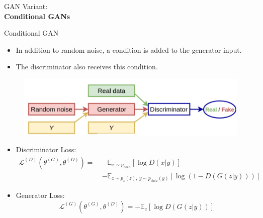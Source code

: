 \begin{frame}{}
    \LARGE GAN Variant: \\[1.5ex] \textbf{Conditional GANs}
\end{frame}

\begin{frame}[allowframebreaks]{Conditional GAN}
\begin{itemize}
    \item In addition to random noise, a condition is added to the generator input. 
    \item The discriminator also receives this condition.
\end{itemize}
\begin{figure}
    \centering
    \includegraphics[height=0.8\textheight, width=\textwidth, keepaspectratio]{images/gan/cond_gan_1.png}
\end{figure}

\framebreak
\begin{itemize}
    \item Discriminator Loss:
    \begin{align*}
    \mathcal{L}^{(D)} \left( \theta^{(G)}, \theta^{(D)} \right) =\ & 
    - \mathbb{E}_{x \sim p_{data}} \left[ \log D(x|y) \right] \\
    & - \mathbb{E}_{z \sim p_z(z),\ y \sim p_{data}(y)} \left[ \log(1 - D(G(z|y))) \right]
    \end{align*}
    \item Generator Loss:
    $$
    \mathcal{L}^{(G)} \left( \theta^{(G)}, \theta^{(D)} \right) = - \mathbb{E}_z \left[ \log D(G(z|y)) \right]
    $$
\end{itemize}


\end{frame}
